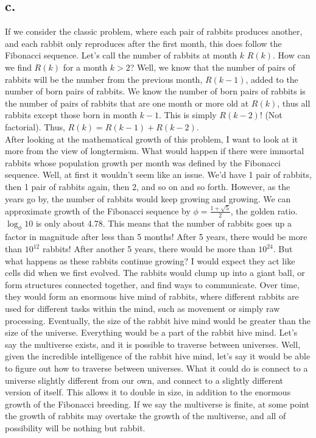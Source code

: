\documentclass{article}
\begin{document}
\subsection*{c. }
If we consider the classic problem, where each pair of rabbits produces another, and each rabbit only reproduces after the first month, this does follow the Fibonacci sequence. Let's call the number of rabbits at month $k$ $R(k)$. How can we find $R(k)$ for a month $k>2$? Well, we know that the number of pairs of rabbits will be the number from the previous month, $R(k-1)$, added to the number of born pairs of rabbits. We know the number of born pairs of rabbits is the number of pairs of rabbits that are one month or more old at $R(k)$, thus all rabbits except those born in month $k-1$. This is simply $R(k-2)$! (Not factorial). Thus, $R(k)=R(k-1)+R(k-2)$. 
\\After looking at the mathematical growth of this problem, I want to look at it more from the view of longtermism. What would happen if there were immortal rabbits whose population growth per month was defined by the Fibonacci sequence. Well, at first it wouldn't seem like an issue. We'd have 1 pair of rabbits, then 1 pair of rabbits again, then 2, and so on and so forth. However, as the years go by, the number of rabbits would keep growing and growing. We can approximate growth of the Fibonacci sequence by $\phi=\frac{1+\sqrt{5}}{2}$, the golden ratio. $\log_{\phi}10$ is only about 4.78. This means that the number of rabbits goes up a factor in magnitude after less than 5 months! After 5 years, there would be more than $10^{12}$ rabbits! After another 5 years, there would be more than $10^{24}$. But what happens as these rabbits continue growing? I would expect they act like cells did when we first evolved. The rabbits would clump up into a giant ball, or form structures connected together, and find ways to communicate. Over time, they would form an enormous hive mind of rabbits, where different rabbits are used for different tasks within the mind, such as movement or simply raw processing. Eventually, the size of the rabbit hive mind would be greater than the size of the universe. Everything would be a part of the rabbit hive mind. Let's say the multiverse exists, and it is possible to traverse between universes. Well, given the incredible intelligence of the rabbit hive mind, let's say it would be able to figure out how to traverse between universes. What it could do is connect to a universe slightly different from our own, and connect to a slightly different version of itself. This allows it to double in size, in addition to the enormous growth of the Fibonacci breeding. If we say the multiverse is finite, at some point the growth of rabbits may overtake the growth of the multiverse, and all of possibility will be nothing but rabbit.
\end{document}
